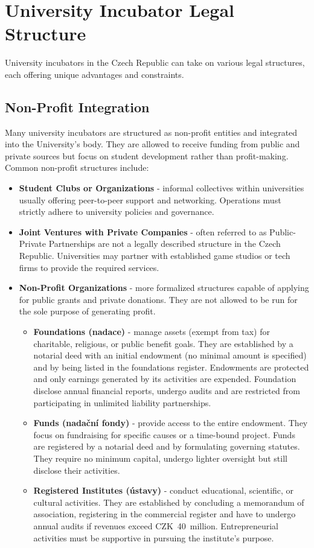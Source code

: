 \section{University Incubator Legal Structure}
University incubators in the Czech Republic can take on various legal structures, each offering unique advantages and constraints.

\subsection{Non-Profit Integration}
Many university incubators are structured as non-profit entities and integrated into the University's body. They are allowed to receive funding from public and private sources but focus on student development rather than profit-making. Common non-profit structures include:
\begin{itemize}
    \item \textbf{Student Clubs or Organizations} - informal collectives within universities usually offering peer-to-peer support and networking. Operations must strictly adhere to university policies and governance.
    \item \textbf{Joint Ventures with Private Companies} - often referred to as Public-Private Partnerships are not a legally described structure in the Czech Republic. Universities may partner with established game studios or tech firms to provide the required services.
    \item \textbf{Non-Profit Organizations} -  more formalized structures capable of applying for public grants and private donations. They are not allowed to be run for the sole purpose of generating profit.
    \begin{itemize}
        \item \textbf{Foundations (nadace)} - manage assets (exempt from tax) for charitable, religious, or public benefit goals. They are established by a notarial deed with an initial endowment (no minimal amount is specified) and by being listed in the foundations register. Endowments are protected and only earnings generated by its activities are expended. Foundation disclose annual financial reports, undergo audits and are restricted from participating in unlimited liability partnerships.
        \item \textbf{Funds (nadační fondy)} - provide access to the entire endowment. They focus on fundraising for specific causes or a time-bound project. Funds are registered by a notarial deed and by formulating governing statutes. They require no minimum capital, undergo lighter oversight but still disclose their activities.
        \item \textbf{Registered Institutes (ústavy)} - conduct educational, scientific, or cultural activities. They are established by concluding a memorandum of association, registering in the commercial register and have to undergo annual audits if revenues exceed CZK~40~million. Entrepreneurial activities must be supportive in pursuing the institute’s purpose.
    \end{itemize}
\end{itemize}

